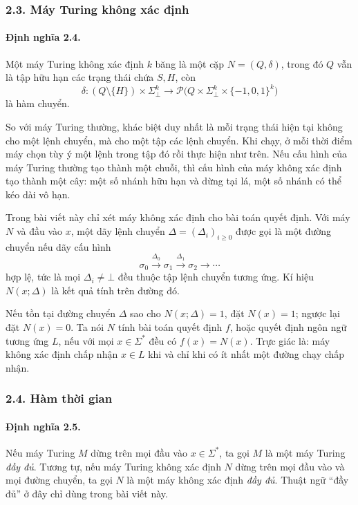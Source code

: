 \documentclass[11pt]{article}
\begin{document}
\subsubsection*{2.3. Máy Turing không xác định}

\paragraph{Định nghĩa 2.4.}
Một máy Turing không xác định \(k\) băng là một cặp \(N=(Q,\delta)\), trong đó
\(Q\) vẫn là tập hữu hạn các trạng thái chứa \(S,H\), còn
\[
  \delta:(Q\setminus\{H\})\times\Sigma_{\bot}^k
  \to \mathcal P\bigl(Q\times\Sigma_{\bot}^k\times\{-1,0,1\}^k\bigr)
\]
là hàm chuyển.

So với máy Turing thường, khác biệt duy nhất là mỗi trạng thái hiện tại không
cho một lệnh chuyển, mà cho một tập các lệnh chuyển. Khi chạy, ở mỗi thời điểm
máy chọn tùy ý một lệnh trong tập đó rồi thực hiện như trên. Nếu cấu hình của
máy Turing thường tạo thành một chuỗi, thì cấu hình của máy không xác định tạo
thành một cây: một số nhánh hữu hạn và dừng tại lá, một số nhánh có thể kéo dài
vô hạn.

Trong bài viết này chỉ xét máy không xác định cho bài toán quyết định. Với máy
\(N\) và đầu vào \(x\), một dãy lệnh chuyển \(\Delta=(\Delta_i)_{i\ge0}\) được
gọi là một đường chuyển nếu dãy cấu hình
\[
  \sigma_0\xrightarrow{\Delta_0}\sigma_1\xrightarrow{\Delta_1}
  \sigma_2\to\cdots
\]
hợp lệ, tức là mọi \(\Delta_i\ne\bot\) đều thuộc tập lệnh chuyển tương ứng. Kí
hiệu \(N(x;\Delta)\) là kết quả tính trên đường đó.

Nếu tồn tại đường chuyển \(\Delta\) sao cho \(N(x;\Delta)=1\), đặt
\(N(x)=1\); ngược lại đặt \(N(x)=0\). Ta nói \(N\) tính bài toán quyết định
\(f\), hoặc quyết định ngôn ngữ tương ứng \(L\), nếu với mọi \(x\in\Sigma^*\)
đều có \(f(x)=N(x)\). Trực giác là: máy không xác định chấp nhận \(x\in L\) khi
và chỉ khi có ít nhất một đường chạy chấp nhận.

\subsubsection*{2.4. Hàm thời gian}

\paragraph{Định nghĩa 2.5.}
Nếu máy Turing \(M\) dừng trên mọi đầu vào \(x\in\Sigma^*\), ta gọi \(M\) là
một máy Turing \emph{đầy đủ}. Tương tự, nếu máy Turing không xác định \(N\) dừng
trên mọi đầu vào và mọi đường chuyển, ta gọi \(N\) là một máy không xác định
\emph{đầy đủ}. Thuật ngữ ``đầy đủ'' ở đây chỉ dùng trong bài viết này.
\end{document}
